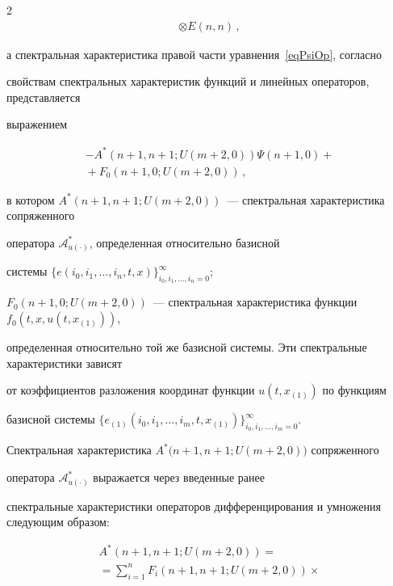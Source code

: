 \begin{multicols}{2}
\begin{multline*}
\otimes E(n,n)\,,


\end{multline*}


а спектральная характеристика правой час\-ти уравнения~\eqref{eqPsiOp}, согласно 


свойствам спект\-раль\-ных характеристик функций и линейных операторов, представляется 


выражением 


\begin{multline*}


- A^*(n+1,n+1; U(m+2,0))  \Psi(n+1,0) +{}\\


{}+ F_0(n+1,0; U(m+2,0))\,,


\end{multline*} 


в котором ${A^*(n+1,n+1; U(m+2,0))}$~--- спект\-раль\-ная характеристика сопряженного 


оператора $\mathcal{A}^*_{u(\cdot)}$, определенная относительно базисной 


сис\-те\-мы ${\{e(i_0,i_1,\dots,i_n,t,x)\}_{i_0,i_1,\dots,i_n = 0}^\infty}$; 


${F_0(n+1,0; U(m+2,0))}$~--- спектральная характеристика функции ${f_0(t,x,u(t,x_{(1)}))}$, 


определенная относительно той же базисной системы. Эти спектральные характеристики зависят 


от коэффициентов разложения координат функции $u(t,x_{(1)})$ по функциям 


базисной сис\-те\-мы ${\{e_{(1)}(i_0,i_1,\dots,i_m,t,x_{(1)})\}_{i_0,i_1,\dots,i_m = 0}^\infty}$.





Спектральная характеристика $A^*(n+1,n+1;$\linebreak $U(m+2,0))$ сопряженного 


оператора $\mathcal{A}^*_{u(\cdot)}$ выражается через введенные ранее 


спектральные характеристики операторов дифференцирования и умножения следующим образом:


\begin{multline}


\label{eqSpAS}


  A^*(n+1,n+1; U(m+2,0)) = {}\\


{}  = \sum\limits_{i = 1}^n F_i(n+1,n+1; U(m+2,0)) \times{}\\



\end{multline}
\end{multicols}
